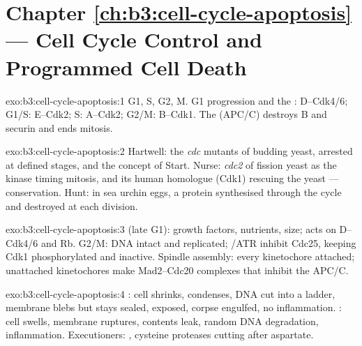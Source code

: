 \section*{Chapter \ref{ch:b3:cell-cycle-apoptosis} --- Cell Cycle Control and Programmed Cell Death}

\begin{solution}{exo:b3:cell-cycle-apoptosis:1}
G1, S, G2, M. G1 progression and the :  D--Cdk4/6;
G1/S:  E--Cdk2; S:  A--Cdk2; G2/M:  B--Cdk1. The
 (APC/C) destroys  B and securin and
ends mitosis.
\end{solution}

\begin{solution}{exo:b3:cell-cycle-apoptosis:2}
Hartwell: the \emph{cdc} mutants of budding yeast, arrested at defined
stages, and the concept of Start. Nurse: \emph{cdc2} of fission yeast
as the kinase timing mitosis, and its human homologue (Cdk1) rescuing
the yeast --- conservation. Hunt:  in sea urchin eggs, a protein
synthesised through the cycle and destroyed at each division.
\end{solution}

\begin{solution}{exo:b3:cell-cycle-apoptosis:3}
 (late G1): growth factors, nutrients, size; acts on
 D--Cdk4/6 and Rb. G2/M: DNA intact and replicated; /ATR
inhibit Cdc25, keeping Cdk1 phosphorylated and inactive. Spindle
assembly: every kinetochore attached; unattached kinetochores make
Mad2--Cdc20 complexes that inhibit the APC/C.
\end{solution}

\begin{solution}{exo:b3:cell-cycle-apoptosis:4}
: cell shrinks,  condenses, DNA cut into a ladder,
membrane blebs but stays sealed,  exposed, corpse
engulfed, no inflammation. : cell swells, membrane ruptures,
contents leak, random DNA degradation, inflammation. Executioners:
, cysteine proteases cutting after aspartate.
\end{solution}

